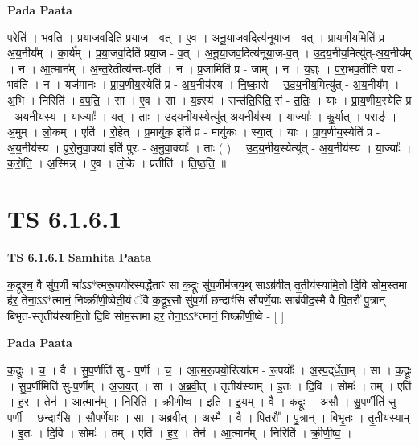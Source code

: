 \documentclass[17pt]{extarticle}
\begin{document}
\textbf{Pada Paata} \newline

परेति॑ । भ॒व॒ति॒ । प्र॒या॒जव॒दिति॑ प्रया॒ज - व॒त् । ए॒व । अ॒नू॒या॒जव॒दित्य॑नूया॒ज - व॒त् । प्रा॒य॒णीय॒मिति॑ प्र - अ॒य॒नीय᳚म् । का॒र्य᳚म् । प्र॒या॒जव॒दिति॑ प्रया॒ज - व॒त् । अ॒नू॒या॒जव॒दित्य॑नूया॒ज-व॒त् । उ॒द॒य॒नीय॒मित्यु॑त्-अ॒य॒नीय᳚म् । न । आ॒त्मान᳚म् । अ॒न्त॒रेतीत्य॑न्तः-एति॑ । न । प्र॒जामिति॑ प्र - जाम् । न । य॒ज्ञ्ः । प॒रा॒भव॒तीति॑ परा - भव॑ति । न । यज॑मानः । प्रा॒य॒णीय॒स्येति॑ प्र - अ॒य॒नीय॑स्य । नि॒ष्का॒से । उ॒द॒य॒नीय॒मित्यु॑त् - अ॒य॒नीय᳚म् । अ॒भि । निरिति॑ । व॒प॒ति॒ । सा । ए॒व । सा । य॒ज्ञ्स्य॑ । सन्त॑ति॒रिति॒ सं - त॒तिः॒ । याः । प्रा॒य॒णीय॒स्येति॑ प्र - अ॒य॒नीय॑स्य । या॒ज्याः᳚ । यत् । ताः । उ॒द॒य॒नीय॒स्येत्यु॑त्-अ॒य॒नीय॑स्य । या॒ज्याः᳚ । कु॒र्यात् । पराङ्॑ । अ॒मुम् । लो॒कम् । एति॑ । रो॒हे॒त् । प्र॒मायु॑क॒ इति॑ प्र - मायु॑कः । स्या॒त् । याः । प्रा॒य॒णीय॒स्येति॑ प्र - अ॒य॒नीय॑स्य । पु॒रो॒नु॒वा॒क्या॑ इति॑ पुरः - अ॒नु॒वा॒क्याः᳚ । ताः ( ) । उ॒द॒य॒नीय॒स्येत्यु॑त् - अ॒य॒नीय॑स्य । या॒ज्याः᳚ । क॒रो॒ति॒ । अ॒स्मिन्न् । ए॒व । लो॒के । प्रतीति॑ । ति॒ष्ठ॒ति॒ ॥  \newline




\section*{ TS 6.1.6.1 }

\textbf{TS 6.1.6.1 } \newline
\textbf{Samhita Paata} \newline

क॒द्रूश्च॒ वै सु॑प॒र्णी चा᳚ऽऽ*त्मरू॒पयो॑रस्पर्द्धेताꣳ॒॒ सा क॒द्रूः सु॑प॒र्णीम॑जय॒थ् साऽब्र॑वीत् तृ॒तीय॑स्यामि॒तो दि॒वि सोम॒स्तमा ह॑र॒ तेना॒ऽऽ*त्मानं॒ निष्क्री॑णी॒ष्वेती॒यं ॅवै क॒द्रूर॒सौ सु॑प॒र्णी छन्दाꣳ॑सि सौपर्णे॒याः साब्र॑वीद॒स्मै वै पि॒तरौ॑ पु॒त्रान् बि॑भृत-स्तृ॒तीय॑स्यामि॒तो दि॒वि सोम॒स्तमा ह॑र॒ तेना॒ऽऽ*त्मानं॒ निष्क्री॑णी॒ष्वे - [  ] \newline

\textbf{Pada Paata} \newline

क॒द्रूः । च॒ । वै । सु॒प॒र्णीति॑ सु - प॒र्णी । च॒ । आ॒त्म॒रू॒पयो॒रित्या᳚त्म - रू॒पयोः᳚ । अ॒स्प॒द्‌र्धे॒ता॒म् । सा । क॒द्रूः । सु॒प॒र्णीमिति॑ सु-प॒र्णीम् । अ॒ज॒य॒त् । सा । अ॒ब्र॒वी॒त् । तृ॒तीय॑स्याम् । इ॒तः । दि॒वि । सोमः॑ । तम् । एति॑ । ह॒र॒ । तेन॑ । आ॒त्मान᳚म् । निरिति॑ । क्री॒णी॒ष्व॒ । इति॑ । इ॒यम् । वै । क॒द्रूः । अ॒सौ । सु॒प॒र्णीति॑ सु-प॒र्णी । छन्दाꣳ॑सि । सौ॒प॒र्णे॒याः । सा । अ॒ब्र॒वी॒त् । अ॒स्मै । वै । पि॒तरौ᳚ । पु॒त्रान् । बि॒भृ॒तः॒ । तृ॒तीय॑स्याम् । इ॒तः । दि॒वि । सोमः॑ । तम् । एति॑ । ह॒र॒ । तेन॑ । आ॒त्मान᳚म् । निरिति॑ । क्री॒णी॒ष्व॒ ।  \newline
\end{document}
